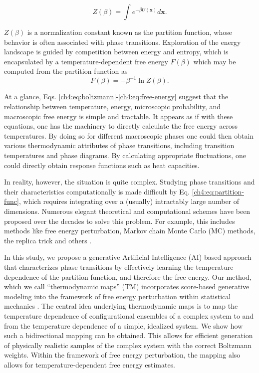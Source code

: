 \begin{equation}
\label{ch4:eq:partition-func}
Z(\beta) = \int e^{-\beta U(\mathbf{x})} d\mathbf{x}. 
\end{equation}

$Z(\beta)$ is a normalization constant known as the partition function, whose behavior is often associated with phase transitions. Exploration of the energy landscape is guided by competition between energy and entropy, which is encapsulated by a temperature-dependent free energy $F(\beta)$ which may be computed from the partition function as
\begin{equation}
    \label{ch4:eq:free-energy}
    F(\beta) = -\beta^{-1} \ln Z(\beta).
\end{equation}

At a glance, Eqs. \ref{ch4:eq:boltzmann}-\ref{ch4:eq:free-energy} suggest that the relationship between temperature, energy, microscopic probability, and macroscopic free energy is simple and tractable. It appears as if with these equations, one has the machinery to directly calculate the free energy across temperatures. By doing so for different macroscopic phases one could then obtain various thermodynamic attributes of phase transitions, including transition temperatures and phase diagrams. By calculating appropriate fluctuations, one could directly obtain response functions such as heat capacities.

In reality, however, the situation is quite complex. Studying phase transitions and their characteristics computationally is made difficult by Eq. \ref{ch4:eq:partition-func}, which requires integrating over a (usually) intractably large number of dimensions. Numerous
elegant theoretical and computational schemes have been proposed over the decades to solve this problem. For example, this includes methods like free energy perturbation, Markov chain Monte Carlo (MC) methods,  the replica trick and others \cite{zwanzig-fep,monte-carlo-review,wham,bar,mbar,parisi-replica-trick}.

In this study, we propose a generative Artificial Intelligence (AI) based approach that characterizes phase transitions by effectively learning the temperature dependence of the partition function, and therefore the free energy. Our method, which we call ``thermodynamic maps'' (TM) incorporates score-based generative modeling into the framework of free energy perturbation within statistical mechanics \cite{nonequilibrium-learning,Ho2020DDPM,Song2021ScoreBased,ddpm-remd}. The central idea underlying thermodynamic maps is to map the temperature dependence of configurational ensembles of a complex system to and from the temperature dependence of a simple, idealized system. We show how such a bidirectional mapping can be obtained. This allows for efficient generation of physically realistic samples of the complex system with the correct Boltzmann weights. Within the framework of free energy perturbation, the mapping also allows for temperature-dependent free energy estimates. 

